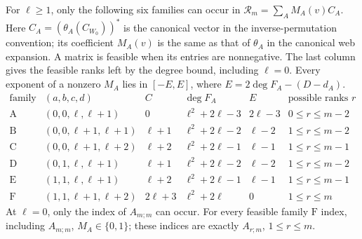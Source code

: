 \documentclass[a4paper,11pt]{amsart}
\numberwithin{equation}{subsection}
\theoremstyle{plain}
\theoremstyle{definition}
\theoremstyle{remark}
\begin{document}
\begin{lemma}\label{prop:algebraic-six}
For $\ell\ge1$, only the following six families can occur in
$\mathcal R_m=\sum_A M_A(v)C_A$. 
Here $C_A=(\theta_A(C_{W_0}))^*$ is the canonical vector in the
inverse-permutation convention; its coefficient $M_A(v)$ is the same
as that of $\theta_A$ in the canonical web expansion.
A matrix is feasible when its entries are nonnegative.
The last column gives the feasible ranks left by the degree bound, including $\ell=0$.
Every exponent of a nonzero $M_A$ lies in $[-E,E]$, where $E=2\deg F_A-(D-d_A)$.
\[
\begin{array}{c|c|c|c|c|c}
\text{family}&(a,b,c,d)&C&\deg F_A&E&\text{possible ranks }r\\\hline
\mathrm A&(0,0,\ell,\ell+1)&0&\ell^2+2\ell-3&2\ell-3&0\le r\le m-2\\
\mathrm B&(0,0,\ell+1,\ell+1)&\ell+1&\ell^2+2\ell-2&\ell-2&1\le r\le m-2\\
\mathrm C&(0,0,\ell+1,\ell+2)&\ell+2&\ell^2+2\ell-1&\ell-1&1\le r\le m-1\\
\mathrm D&(0,1,\ell,\ell+1)&\ell+1&\ell^2+2\ell-2&\ell-2&1\le r\le m-2\\
\mathrm E&(1,1,\ell,\ell+1)&\ell+2&\ell^2+2\ell-1&\ell-1&1\le r\le m-1\\
\mathrm F&(1,1,\ell+1,\ell+2)&2\ell+3&\ell^2+2\ell&0&1\le r\le m
\end{array}
\]
At $\ell=0$, only the index of $A_{m;m}$ can occur.
For every feasible family $\mathrm F$ index, including $A_{m;m}$,
$M_A\in\{0,1\}$; these indices are exactly $A_{r;m}$, $1\le r\le m$.
\end{lemma}
\end{document}

